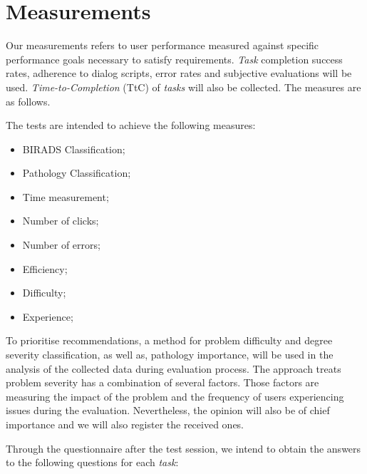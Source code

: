 \section{Measurements}
\label{sec:sec007}

Our measurements refers to user performance measured against specific performance goals necessary to satisfy requirements. \textit{Task} completion success rates, adherence to dialog scripts, error rates and subjective evaluations will be used. \textit{Time-to-Completion} (TtC) of \textit{tasks} will also be collected. The measures are as follows.

\hfill


The tests are intended to achieve the following measures:


\hfill

\begin{itemize}
\item BIRADS Classification;
\item Pathology Classification;
\item Time measurement;
\item Number of clicks;
\item Number of errors;
\item Efficiency;
\item Difficulty;
\item Experience;
\end{itemize}

\hfill


To prioritise recommendations, a method for problem difficulty and degree severity classification, as well as, pathology importance, will be used in the analysis of the collected data during evaluation process. The approach treats problem severity has a combination of several factors. Those factors are measuring the impact of the problem and the frequency of users experiencing issues during the evaluation. Nevertheless, the opinion will also be of chief importance and we will also register the received ones.

\hfill


Through the questionnaire after the test session, we intend to obtain the answers to the following questions for each \textit{task}:

